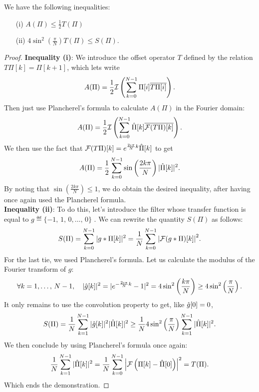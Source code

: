 
\begin{prop}
We have the following inequalities: \begin{itemize}
\item [{\upshape (i)}] $ A (\Pi) \leq \frac{1}{2} T (\Pi) $
\item [{\upshape (ii)}] $ 4 \sin^2 \left(\frac{\pi}{N} \right) T (\Pi) \leq S (\Pi) $.
\end{itemize}
\end{prop}
\begin{proof}
 \textbf{Inequality (i)}: We introduce the offset operator $ T $ defined by the relation $ T \Pi [k] = \Pi [k + 1] $, which lets write
\begin{equation*}
A (\Pi) = \frac{1}{2} \mathcal{I} \left(\sum_{k = 0}^{N-1}{\Pi [i] \overline{T \Pi [i]}} \right).
\end{equation*}
Then just use Plancherel's formula to calculate $ A (\Pi) $ in the Fourier domain:
\begin{equation*}
A (\Pi) = \frac{1}{2} \mathcal{I} \left(\sum_{k = 0}^{N-1}{\hat{\Pi}[k] \overline{\mathcal{F}(T \Pi) [k]}} \right).
\end{equation*}
We then use the fact that $ \mathcal{F}(T \Pi) [k] = e^{\frac{2 \imath \pi}{N} k} \hat{\Pi}[k] $ to get
\begin{equation*}
A (\Pi) = \frac{1}{2} \sum_{k = 0}^{N-1}{\sin \left(\frac{2 k \pi}{N} \right) | \hat{\Pi}[k] |^2}.
\end{equation*}
By noting that $ \sin \left(\frac{2 k \pi}{N} \right) \leq 1 $, we do obtain the desired inequality, after having once again used the Plancherel formula. \\\textbf{Inequality (ii)}: To do this, let's introduce the filter whose transfer function is equal to $ g \eqdef \{- 1, \, 1, \, 0, \ldots, \, 0 \} $ . We can rewrite the quantity $ S (\Pi) $ as follows:
\begin{equation*}
S (\Pi) = \sum_{k = 0}^{N-1}{| g * \Pi [k] |^2} = \frac{1}{N} \sum_{k = 0}^{N-1}{\left| \mathcal{F}(g * \Pi) [k] \right|^2}.
\end{equation*}
For the last tie, we used Plancherel's formula. Let us calculate the modulus of the Fourier transform of $ g $:
\begin{equation*}
\forall k = 1, \ldots, \, N-1, \quad | \hat{g}[k] |^2 = | e^{- \frac{2 \imath \pi}{N} k} - 1 |^2 = 4 \sin^2 \left(\frac{k \pi}{N} \right) \geq 4 \sin^2 \left(\frac{\pi}{N} \right).
\end{equation*}
It only remains to use the convolution property to get, like $ \hat{g}[0] = 0 $,
\begin{equation*}
S (\Pi) = \frac{1}{N} \sum_{k = 1}^{N-1}{| \hat{g}[k] |^2 | \hat{\Pi}[k] |^2} \geq \frac{1}{N} 4 \sin^2 \left(\frac{\pi}{N} \right) \sum_{k = 1}^{N-1}{| \hat{\Pi}[k] |^2}.
\end{equation*}
We then conclude by using Plancherel's formula once again:
\begin{equation*}
\frac{1}{N} \sum_{k = 1}^{N-1}{| \hat{\Pi}[k] |^2} = \frac{1}{N} \sum_{k = 0}^{N-1}{\left| \mathcal{F} \left(\Pi [k] - \hat{\Pi}[0] \right) \right|^2} = T (\Pi).
\end{equation*}
Which ends the demonstration.
\end{proof}
 
